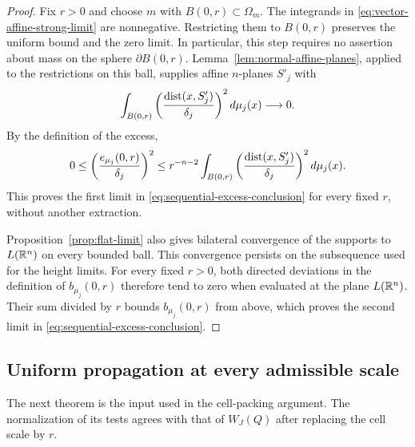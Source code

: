 \begin{proof}
Fix $r>0$ and choose $m$ with $B(0,r)\subset\Omega_m$.
The integrands in \eqref{eq:vector-affine-strong-limit} are
nonnegative. Restricting them to $B(0,r)$ preserves the uniform bound
and the zero limit. In particular, this step requires no assertion about
mass on the sphere $\partial B(0,r)$.
Lemma~\ref{lem:normal-affine-planes}, applied to the restrictions on
this ball, supplies affine $n$-planes $S'_j$ with
\[
 \int_{B(0,r)}\left(\frac{\operatorname{dist}(x,S'_j)}{\delta_j}\right)^2
       d\mu_j(x)\longrightarrow0.
\]
By the definition of the excess,
\[
 0\le\left(\frac{e_{\mu_j}(0,r)}{\delta_j}\right)^2
 \le r^{-n-2}\int_{B(0,r)}
       \left(\frac{\operatorname{dist}(x,S'_j)}{\delta_j}\right)^2d\mu_j(x).
\]
This proves the first limit in
\eqref{eq:sequential-excess-conclusion} for every fixed $r$, without
another extraction.

Proposition~\ref{prop:flat-limit} also gives bilateral convergence of
the supports to $L(\mathbb R^n)$ on every bounded ball. This convergence
persists on the subsequence used for the height limits. For every fixed
$r>0$, both directed deviations in the definition of $b_{\mu_j}(0,r)$
therefore tend to zero when evaluated at the plane $L(\mathbb R^n)$.
Their sum divided by $r$ bounds $b_{\mu_j}(0,r)$ from above,
which proves the second limit in \eqref{eq:sequential-excess-conclusion}.
\end{proof}

\subsection{Uniform propagation at every admissible scale}

The next theorem is the input used in the cell-packing argument. The
normalization of its tests agrees with that of $W_J(Q)$ after replacing
the cell scale by $r$.

